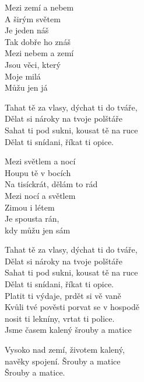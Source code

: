
\ve{}
Mezi zemí a nebem\\
A širým světem\\
Je jeden náš\\
Tak dobře ho znáš \\ 
Mezi nebem a zemí\\
Jsou věci, který\\
Moje milá\\ 
Můžu jen já    

\cho{}
Tahat tě za vlasy, dýchat ti do tváře,\\
Dělat si nároky na tvoje polštáře\\
Sahat ti pod sukni, kousat tě na ruce\\
Dělat ti snídani, říkat ti opice.

\ve{}
Mezi světlem a nocí\\
Houpu tě v bocích\\
Na tisíckrát, dělám to rád\\
Mezi nocí a světlem\\
Zimou i létem\\
Je spousta rán,\\
kdy můžu jen sám      
   
\cho{}
Tahat tě za vlasy, dýchat ti do tváře,\\
Dělat si nároky na tvoje polštáře\\
Sahat ti pod sukni, kousat tě na ruce\\
Dělat ti snídani, říkat ti opice.\\
Platit ti výdaje, prdět si vě vaně\\
Kvůli tvé pověsti porvat se v hospodě\\
nosit ti lekníny, vrtat ti police.\\
Jsme časem kalený šrouby a matice

Vysoko nad zemí, životem kalený,\\
navěky spojení. Šrouby a matice\\
Šrouby a matice.

\esong{}